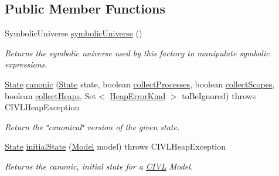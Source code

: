 \subsection*{Public Member Functions}
\begin{DoxyCompactItemize}
\item 
Symbolic\+Universe \hyperlink{interfaceedu_1_1udel_1_1cis_1_1vsl_1_1civl_1_1state_1_1IF_1_1StateFactory_a5ca93a5b12557dcb6337cf3cf41862ec}{symbolic\+Universe} ()
\begin{DoxyCompactList}\small\item\em Returns the symbolic universe used by this factory to manipulate symbolic expressions. \end{DoxyCompactList}\item 
\hyperlink{interfaceedu_1_1udel_1_1cis_1_1vsl_1_1civl_1_1state_1_1IF_1_1State}{State} \hyperlink{interfaceedu_1_1udel_1_1cis_1_1vsl_1_1civl_1_1state_1_1IF_1_1StateFactory_a99001c497b2ff46cd098525744a7d0c1}{canonic} (\hyperlink{interfaceedu_1_1udel_1_1cis_1_1vsl_1_1civl_1_1state_1_1IF_1_1State}{State} state, boolean \hyperlink{interfaceedu_1_1udel_1_1cis_1_1vsl_1_1civl_1_1state_1_1IF_1_1StateFactory_a57003566f5dd8c4905a7e630d90ad5ef}{collect\+Processes}, boolean \hyperlink{interfaceedu_1_1udel_1_1cis_1_1vsl_1_1civl_1_1state_1_1IF_1_1StateFactory_a4ffda85305907c945cc3ffb2d3339eeb}{collect\+Scopes}, boolean \hyperlink{interfaceedu_1_1udel_1_1cis_1_1vsl_1_1civl_1_1state_1_1IF_1_1StateFactory_a78a17339ebd0be7dacaf1f06e78626d7}{collect\+Heaps}, Set$<$ \hyperlink{enumedu_1_1udel_1_1cis_1_1vsl_1_1civl_1_1state_1_1IF_1_1CIVLHeapException_1_1HeapErrorKind}{Heap\+Error\+Kind} $>$ to\+Be\+Ignored)  throws C\+I\+V\+L\+Heap\+Exception
\begin{DoxyCompactList}\small\item\em Return the \char`\"{}canonical\char`\"{} version of the given state. \end{DoxyCompactList}\item 
\hyperlink{interfaceedu_1_1udel_1_1cis_1_1vsl_1_1civl_1_1state_1_1IF_1_1State}{State} \hyperlink{interfaceedu_1_1udel_1_1cis_1_1vsl_1_1civl_1_1state_1_1IF_1_1StateFactory_abcd886f831cb9db1dac78c3aee029751}{initial\+State} (\hyperlink{interfaceedu_1_1udel_1_1cis_1_1vsl_1_1civl_1_1model_1_1IF_1_1Model}{Model} model)  throws C\+I\+V\+L\+Heap\+Exception
\begin{DoxyCompactList}\small\item\em Returns the canonic, initial state for a \hyperlink{classedu_1_1udel_1_1cis_1_1vsl_1_1civl_1_1CIVL}{C\+I\+V\+L} Model. \end{DoxyCompactList}\item 

\end{DoxyCompactItemize}
